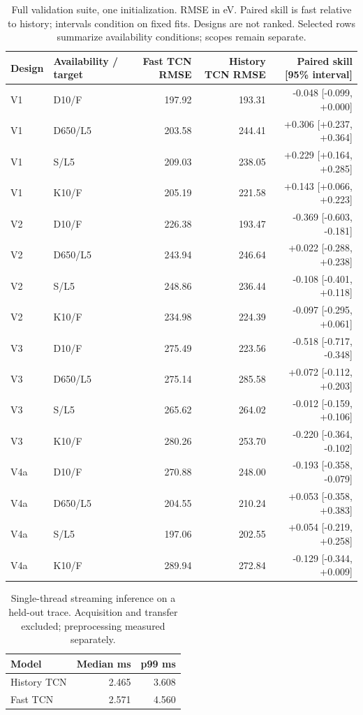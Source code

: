 \begin{table}[t]
\centering\scriptsize
\begin{tabular}{llrrr}\toprule
Design & Availability / target & Fast TCN RMSE & History TCN RMSE & Paired skill [95\% interval]\\\midrule
V1 & D10/F & 197.92 & 193.31 & -0.048 [-0.099, +0.000]\\
V1 & D650/L5 & 203.58 & 244.41 & +0.306 [+0.237, +0.364]\\
V1 & S/L5 & 209.03 & 238.05 & +0.229 [+0.164, +0.285]\\
V1 & K10/F & 205.19 & 221.58 & +0.143 [+0.066, +0.223]\\
V2 & D10/F & 226.38 & 193.47 & -0.369 [-0.603, -0.181]\\
V2 & D650/L5 & 243.94 & 246.64 & +0.022 [-0.288, +0.238]\\
V2 & S/L5 & 248.86 & 236.44 & -0.108 [-0.401, +0.118]\\
V2 & K10/F & 234.98 & 224.39 & -0.097 [-0.295, +0.061]\\
V3 & D10/F & 275.49 & 223.56 & -0.518 [-0.717, -0.348]\\
V3 & D650/L5 & 275.14 & 285.58 & +0.072 [-0.112, +0.203]\\
V3 & S/L5 & 265.62 & 264.02 & -0.012 [-0.159, +0.106]\\
V3 & K10/F & 280.26 & 253.70 & -0.220 [-0.364, -0.102]\\
V4a & D10/F & 270.88 & 248.00 & -0.193 [-0.358, -0.079]\\
V4a & D650/L5 & 204.55 & 210.24 & +0.053 [-0.358, +0.383]\\
V4a & S/L5 & 197.06 & 202.55 & +0.054 [-0.219, +0.258]\\
V4a & K10/F & 289.94 & 272.84 & -0.129 [-0.344, +0.009]\\
\bottomrule\end{tabular}
\caption{Full validation suite, one initialization. RMSE in eV. Paired skill is fast relative to history; intervals condition on fixed fits. Designs are not ranked. Selected rows summarize availability conditions; scopes remain separate.}
\end{table}
\begin{table}[t]\centering\small
\begin{tabular}{lrr}\toprule Model & Median ms & p99 ms\\\midrule
History TCN & 2.465 & 3.608\\
Fast TCN & 2.571 & 4.560\\
\bottomrule\end{tabular}\caption{Single-thread streaming inference on a held-out trace. Acquisition and transfer excluded; preprocessing measured separately.}\end{table}
